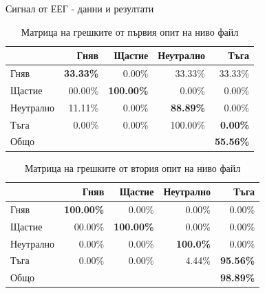 \documentclass[9pt]{beamer}
\begin{document}
    \begin{frame}[t]{Сигнал от ЕЕГ - данни и резултати}
        \pause
        \begin{table}[h]
            \begin{center}
            \begin{tabular}{|l|r r r r|} 
                \hline
                & Гняв & Щастие & Неутрално & Тъга \\ 
                \hline
                Гняв &  \textbf{33.33\%} & 0.00\% & 33.33\% & 33.33\% \\ 
                Щастие & 00.00\% & \textbf{100.00\%} & 0.00\% & 0.00\% \\ 
                Неутрално & 11.11\% & 0.00\% & \textbf{88.89\%} & 0.00\% \\ 
                Тъга & 0.00\% & 0.00\% & 100.00\% & \textbf{0.00\%}\\ 
                \hline
                \hline
                Общо & & & & \textbf{55.56\%}\\
                \hline
            \end{tabular}
            \caption*{Матрица на грешките от първия опит на ниво файл}
            \end{center}
        \end{table}
        \pause
        \begin{table}[h]
            \begin{center}
                \begin{tabular}{|l|r r r r|} 
                    \hline
                    & Гняв & Щастие & Неутрално & Тъга \\ 
                    \hline
                    Гняв &  \textbf{100.00\%} & 0.00\% & 0.00\% & 0.00\% \\ 
                    Щастие & 00.00\% & \textbf{100.00\%} & 0.00\% & 0.00\% \\ 
                    Неутрално & 0.00\% & 0.00\% & \textbf{100.0\%} & 0.00\% \\ 
                    Тъга & 0.00\% & 0.00\% & 4.44\% & \textbf{95.56\%}\\ 
                    \hline
                    \hline
                    Общо & & & & \textbf{98.89\%}\\
                    \hline
                \end{tabular}
                \caption*{Матрица на грешките от втория опит на ниво файл}
            \end{center}
        \end{table}
    \end{frame}
\end{document}
